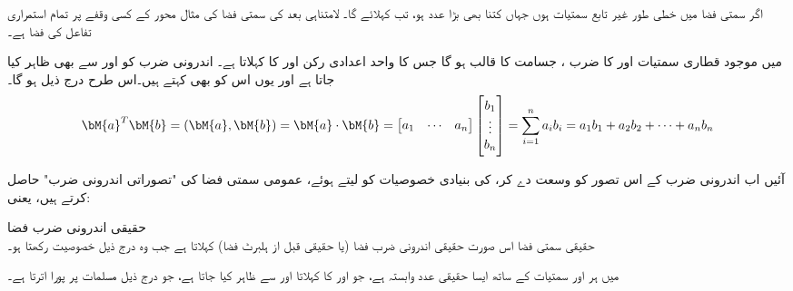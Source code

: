 اگر سمتی فضا   میں  خطی طور غیر تابع  سمتیات ہوں جہاں  کتنا بھی بڑا عدد ہو، تب   کہلائے گا۔ لامتناہی بعد کی  سمتی فضا کی مثال  محور کے کسی وقفے  پر تمام استمراری تفاعل کی فضا ہے۔ 

 میں موجود قطاری سمتیات  اور  کا ضرب ، جسامت  کا قالب ہو گا جس کا واحد اعدادی رکن  اور  کا  کہلاتا ہے۔ اندرونی ضرب کو  اور  سے بھی ظاہر کیا جاتا ہے اور یوں اس کو   بھی کہتے ہیں۔اس طرح درج ذیل ہو گا۔
\begin{align}
\bM{a}^T\bM{b}=(\bM{a},\bM{b})=\bM{a}\cdot \bM{b}=\begin{bmatrix} a_1&\cdots&a_n \end{bmatrix} \begin{bmatrix}b_1\\\vdots\\ b_n  \end{bmatrix}=\sum_{i=1}^{n}a_i b_i=a_1b_1+a_2b_2+\cdots+a_nb_n
\end{align}

آئیں اب اندرونی ضرب کے اس تصور کو وسعت دے کر،  کی بنیادی خصوصیات کو لیتے ہوئے، عمومی سمتی فضا کی "تصوراتی اندرونی ضرب"  حاصل کرتے ہیں، یعنی:

\quad حقیقی اندرونی ضرب فضا\\
حقیقی سمتی فضا  اس صورت حقیقی اندرونی ضرب فضا (یا حقیقی قبل از ہلبرٹ فضا) کہلاتا ہے جب وہ درج ذیل خصوصیت رکھتا ہو۔

 میں ہر  اور  سمتیات کے ساتھ ایسا حقیقی عدد وابستہ ہے، جو  اور  کا  کہلاتا اور  سے ظاہر کیا جاتا ہے،  جو درج ذیل  مسلمات پر پورا اترتا ہے۔
 
